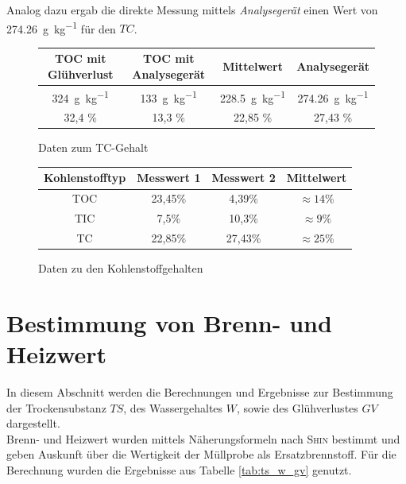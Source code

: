 Analog dazu ergab die direkte Messung mittels \textit{Analysegerät} einen Wert von \SI{274,26}{\gram \per \kg} für den $TC$.
\vspace*{-5mm}
\begin{figure}[h!]
\renewcommand{\arraystretch}{1.2}
	\centering
	\caption{Daten zum TC-Gehalt}
	\begin{tabular}{c|c|c||c}
	\hline
	\textbf{TOC mit Glühverlust} & \textbf{TOC mit Analysegerät} & \textbf{Mittelwert} & \textbf{Analysegerät} \\
	\hline
	\SI{324}{\gram \per \kg} & \SI{133}{\gram \per \kg} & \SI{228,5}{\gram \per \kg} & \SI{274,26}{\gram \per \kg}\\
	\hline
	 32,4 \% & 13,3 \% & 22,85 \% & 27,43 \%\\
	\hline
	\end{tabular}
\end{figure}
\FloatBarrier

\vspace*{-5mm}
\begin{figure}[h!]
	\renewcommand{\arraystretch}{1.2}
	\centering
	\caption{Daten zu den Kohlenstoffgehalten}
	\label{tab:tc}
	\begin{tabular}{c|c|c||c}
		\hline
		\textbf{Kohlenstofftyp} & \textbf{Messwert 1} & \textbf{Messwert 2} & \textbf{Mittelwert}  \\
		\hline
		TOC		&	23,45\%		& 4,39\%	& $\approx 14\%$\\
		TIC		&	7,5\%		& 10,3\%	& $\approx 9\%$ \\
		TC		&	22,85\%		& 27,43\%	& $\approx 25\%$ \\
		\hline
	\end{tabular}
\end{figure}
\FloatBarrier

\newpage

\section{Bestimmung von Brenn- und Heizwert}
In diesem Abschnitt werden die Berechnungen und Ergebnisse zur Bestimmung der Trockensubstanz $TS$, des Wassergehaltes $W$, sowie des Glühverlustes $GV$ dargestellt. \\
Brenn- und Heizwert wurden mittels Näherungsformeln nach \textsc{Shin} bestimmt und geben Auskunft über die Wertigkeit der Müllprobe als Ersatzbrennstoff. Für die Berechnung wurden die Ergebnisse aus Tabelle \ref{tab:ts_w_gv} genutzt.

\vspace*{3mm}

